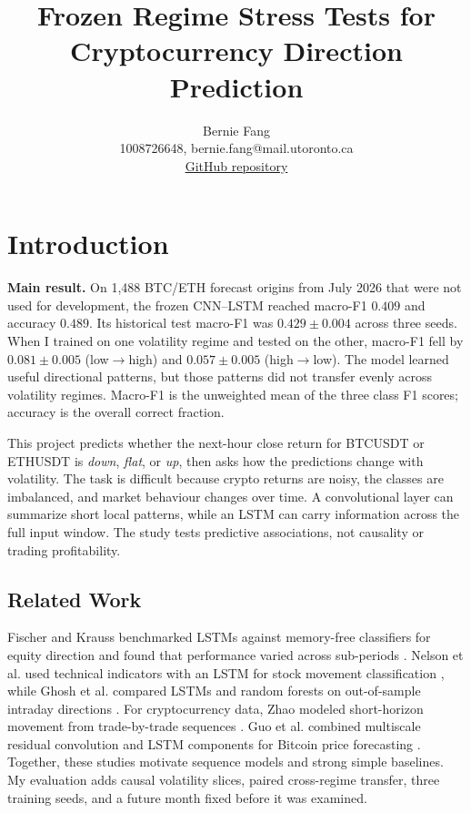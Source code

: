 \documentclass[final]{article}
\title{Frozen Regime Stress Tests for Cryptocurrency Direction Prediction}
\author{Bernie Fang\\1008726648, bernie.fang@mail.utoronto.ca\\
\href{https://github.com/Saberartoria77/APS-360-Project}{GitHub repository}}
\begin{document}
\maketitle
\vspace{-3.8em}
\small

\section{Introduction}
\textbf{Main result.} On 1,488 BTC/ETH forecast origins from July 2026 that were not used for
development, the frozen CNN--LSTM reached macro-F1 $0.409$ and accuracy $0.489$. Its historical test macro-F1 was
$0.429\pm0.004$ across three seeds. When I trained on one volatility regime and tested on the other,
macro-F1 fell by $0.081\pm0.005$ (low$\rightarrow$high) and $0.057\pm0.005$
(high$\rightarrow$low). The model learned useful directional patterns, but those patterns did not
transfer evenly across volatility regimes. Macro-F1 is the unweighted mean of the three class F1
scores; accuracy is the overall correct fraction.

This project predicts whether the next-hour close return for BTCUSDT or ETHUSDT is \emph{down},
\emph{flat}, or \emph{up}, then asks how the predictions change with volatility. The task is difficult
because crypto returns are noisy, the classes are imbalanced, and market behaviour changes over time.
A convolutional layer can summarize short local patterns, while an LSTM can carry information across
the full input window. The study tests predictive associations, not causality or trading profitability.

\subsection{Related Work}
Fischer and Krauss benchmarked LSTMs against memory-free classifiers for equity direction and found
that performance varied across sub-periods \citep{fischer2018deep}. Nelson et al. used technical
indicators with an LSTM for stock movement classification \citep{nelson2017stock}, while Ghosh et
al. compared LSTMs and random forests on out-of-sample intraday directions
\citep{ghosh2020forecasting}. For cryptocurrency data, Zhao modeled short-horizon movement from
trade-by-trade sequences \citep{zhao2021deep}. Guo et al. combined multiscale residual convolution
and LSTM components for Bitcoin price forecasting \citep{guo2021mrclstm}. Together, these studies
motivate sequence models and strong simple baselines. My evaluation adds causal volatility slices,
paired cross-regime transfer, three training seeds, and a future month fixed before it was examined.
\end{document}
